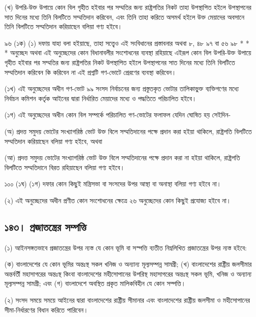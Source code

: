 \documentclass[11pt]{article}
\begin{document}
(খ) উপরি-উক্ত উপায়ে কোন বিল গৃহীত হইবার পর সম্মতির জন্য রাষ্ট্রপতির নিকট
    তাহা উপস্থাপিত হইলে উপস্থাপনের সাত দিনের মধ্যে তিনি বিলটিতে সম্মতিদান
    করিবেন, এবং তিনি তাহা করিতে অসমর্থ হইলে উক্ত মেয়াদের অবসানে তিনি বিলটিতে
    সম্মতিদান করিয়াছেন বলিয়া গণ্য হইবে।

৯৬ (১ক) (১) দফায় যাহা বলা হইয়াছে, তাহা সত্ত্বেও এই সংবিধানের প্রস্তাবনার
অথবা ৮, ৪৮ ৯৭ বা ৫৬ ৯৮ * * * অনুচ্ছেদ অথবা এই অনুচ্ছেদের কোন বিধানাবলীর
সংশোধনের ব্যবস্থা রহিয়াছে এইরূপ কোন বিল উপরি-উক্ত উপায়ে গৃহীত হইবার পর
সম্মতির জন্য রাষ্ট্রপতির নিকট উপস্থাপিত হইলে উপস্থাপনের সাত দিনের মধ্যে তিনি
বিলটিতে সম্মতিদান করিবেন কি করিবেন না এই প্রশ্নটি গণ-ভোটে প্রেরণের ব্যবস্থা
করিবেন।

(১খ) এই অনুচ্ছেদের অধীন গণ-ভোট ৯৯ সংসদ নির্বাচনের জন্য প্রস্তুতকৃত ভোটার
তালিকাভু্ক্ত ব্যক্তিগণের মধ্যে নির্বাচন কমিশন কর্তৃক আইনের দ্বারা নির্ধারিত
মেয়াদের মধ্যে ও পদ্ধতিতে পরিচালিত হইবে।

(১গ) এই অনুচ্ছেদের অধীন কোন বিল সম্পর্কে পরিচালিত গণ-ভোটের ফলাফল যেদিন
ঘোষিত হয় সেইদিন-

(অ) প্রদত্ত সমুদয় ভোটের সংখ্যাগরিষ্ঠ ভোট উক্ত বিলে সম্মতিদানের পক্ষে প্রদান করা
হইয়া থাকিলে, রাষ্ট্রপতি বিলটিতে সম্মতিদান করিয়াছেন বলিয়া গণ্য হইবে, অথবা

(আ) প্রদত্ত সমুদয় ভোটের সংখ্যাগরিষ্ঠ ভোট উক্ত বিলে সম্মতিদানের পক্ষে প্রদান করা
না হইয়া থাকিলে, রাষ্ট্রপতি বিলটিতে সম্মতিদানে বিরত রহিয়াছেন বলিয়া গণ্য
হইবে।

১০০ (১ঘ) (১গ) দফার কোন কিছুই মন্ত্রিসভা বা সংসদের উপর আস্থা বা অনাস্থা
বলিয়া গণ্য হইবে না।

(২) এই অনুচ্ছেদের অধীন প্রণীত কোন সংশোধনের ক্ষেত্রে ২৬ অনুচ্ছেদের কোন কিছুই
    প্রযোজ্য হইবে না।

\subsection{১৪৩। প্রজাতন্ত্রের সম্পত্তি}
\label{sec:org1d5998e}
(১) আইনসঙ্গতভাবে প্রজাতন্ত্রের উপর ন্যস্ত যে কোন ভূমি বা সস্পত্তি ব্যতীত
   নিম্নলিখিত প্রজাতন্ত্রের উপর ন্যস্ত হইবে:

(ক) বাংলাদেশের যে কোন ভূমির অন্তঃস্থ সকল খনিজ ও অন্যান্য মূল্যসম্পন্ন সামগ্রী;
(খ) বাংলাদেশের রাষ্ট্রীয় জলসীমার অন্তর্বর্তী মহাসাগরের অন্তঃস্থ কিংবা
   বাংলাদেশের মহীসোপানের উপরিস্থ মহাসাগরের অন্তঃস্থ সকল ভূমি, খনিজ ও অন্যান্য
   মূল্যসম্পন্ন সামগ্রী; এবং
(গ) বাংলাদেশে অবস্থিত প্রকৃত মালিকবিহীন যে কোন সম্পত্তি।

(২) সংসদ সময়ে সময়ে আইনের দ্বারা বাংলাদেশের রাষ্ট্রীয় সীমানার এবং
বাংলাদেশের রাষ্ট্রীয় জলসীমা ও মহীসোপানের সীমা-নির্ধারণের বিধান করিতে
পারিবেন।
\end{document}
